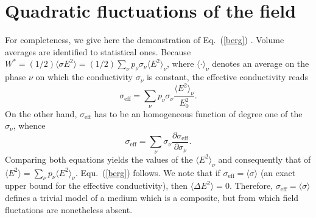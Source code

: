 \section{Quadratic fluctuations of the field}
\label{qfotf}
For completeness, we give here the demonstration of Eq.\ (\ref{berg})
\cite{BERG78}. Volume averages are identified to statistical ones.
Because $W^*=(1/2)\langle \sigma E^2\rangle =(1/2)\sum_\nu p_\nu
\sigma_\nu \langle E^2\rangle_\nu$, where $\langle \cdot \rangle_\nu$
denotes an average on the phase $\nu$ on which the conductivity
$\sigma_\nu$ is constant, the effective conductivity reads
\begin{equation}
\sigma_{\text{eff}}=\sum_\nu p_\nu \sigma_\nu \frac{\langle E^2\rangle_\nu}{E_0^2}.
\end{equation}
On the other hand, $\sigma_{\text{eff}}$ has to be an homogeneous 
function of degree one of the $\sigma_\nu$, whence
\begin{equation}
\sigma_{\text{eff}}=\sum_\nu \sigma_\nu \frac{\partial \sigma_{\text{eff}}}{\partial \sigma_\nu}.
\end{equation}
Comparing both equations yields the values of the 
$\langle E^2\rangle_\nu$ and consequently that of $\langle E^2\rangle
=\sum_\nu p_\nu \langle E^2\rangle_\nu$. Equ.\ (\ref{berg}) follows. 
We note that if $\sigma_{\text{eff}}=\langle\sigma\rangle$ (an exact 
upper bound for the effective conductivity), then 
$\langle \Delta E^2\rangle=0$. Therefore, $\sigma_{\text{eff}}=\langle\sigma\rangle$ defines a trivial model 
of a medium which is a composite, but from which field fluctations 
are nonetheless absent. 

